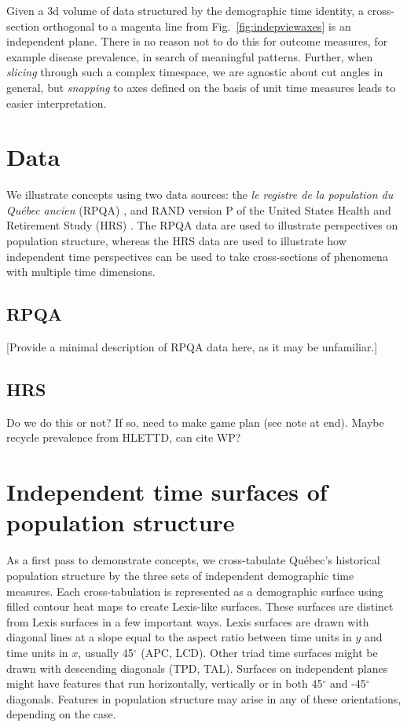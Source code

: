 Given a 3d volume of data structured by the demographic time identity, a cross-section orthogonal to a magenta line from Fig.~\ref{fig:indepviewaxes} is an independent plane. There is no reason not to do this for outcome measures, for example disease prevalence, in search of meaningful patterns. Further, when \emph{slicing} through such a complex timespace, we are agnostic about cut angles in general, but \emph{snapping} to axes defined on the basis of unit time measures leads to easier interpretation.

\pagebreak
\section{Data}
We illustrate concepts using two data sources: the \emph{le registre de la population du Qu\'{e}bec ancien} (RPQA) \citep{desjardins1998}, and RAND version P of the United States Health and Retirement Study (HRS) \citep{HRS, RAND}. The RPQA data are used to illustrate perspectives on population structure, whereas the HRS data are used to illustrate how independent time perspectives
can be used to take cross-sections of phenomena with multiple time dimensions.

\subsection{RPQA}
[Provide a minimal description of RPQA data here, as it may be unfamiliar.]

\subsection{HRS}
Do we do this or not? If so, need to make game plan (see note at end). Maybe recycle prevalence from HLETTD, can cite WP?

\section{Independent time surfaces of population structure}
As a first pass to demonstrate concepts, we cross-tabulate Qu\'{e}bec's historical population structure by the three sets of independent demographic time measures. Each cross-tabulation is represented as a demographic surface using filled contour heat maps to create Lexis-like surfaces. These surfaces are distinct from Lexis surfaces in a few important ways. Lexis surfaces are drawn with diagonal lines at a slope equal to the aspect ratio between time units in $y$ and time units in $x$, usually 45$^\circ$ (APC, LCD). Other triad time surfaces might be drawn with descending diagonals (TPD, TAL). Surfaces on independent planes might have features that run horizontally, vertically or in both 45$^\circ$ and -45$^\circ$ diagonals. Features in population structure may arise in any of these orientations, depending on the case. 

